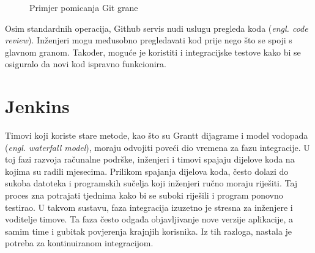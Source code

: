 \begin{figure}[h]
    \centering

    \caption{Primjer pomicanja Git grane}%
    \label{fig:02gitexample2}
\end{figure}

Osim standardnih operacija, Github servis nudi uslugu pregleda koda (\textit{engl. code review}).
Inženjeri mogu međusobno pregledavati kod prije nego što se spoji s glavnom granom. Također, moguće
je koristiti i integracijske testove kako bi se osiguralo da novi kod ispravno funkcionira.

\section{Jenkins}
Timovi koji koriste stare metode, kao što su Grantt dijagrame i model vodopada (\textit{engl.
waterfall model}), moraju odvojiti poveći dio vremena za fazu integracije. U toj fazi razvoja
računalne podrške, inženjeri i timovi spajaju dijelove koda na kojima su radili mjesecima.  Prilikom
spajanja dijelova koda, često dolazi do sukoba datoteka i programskih sučelja koji inženjeri ručno
moraju riješiti. Taj proces zna potrajati tjednima kako bi se suboki riješili i program ponovno
testirao. U takvom sustavu, faza integracija izuzetno je stresna za inženjere i voditelje timove. Ta
faza često odgađa objavljivanje nove verzije aplikacije, a samim time i gubitak povjerenja krajnjih
korisnika. Iz tih razloga, nastala je potreba za kontinuiranom integracijom.

